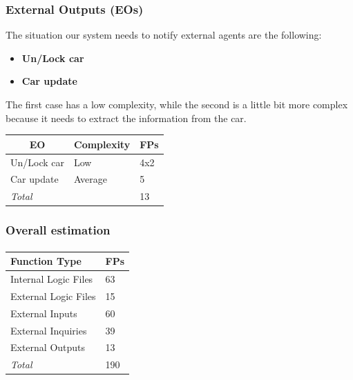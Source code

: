\documentclass[english]{article}
\begin{document}
\paragraph{}

\subsubsection{External Outputs (EOs)}

The situation our system needs to notify external agents are the following:

\begin{itemize}
	\item{\textbf{Un/Lock car}}

	\item{\textbf{Car update}}
\end{itemize}

The first case has a low complexity, while the second is a little bit more complex because it needs to extract the information from the car.

\begin{center}
	\begin{tabular}{ |p{8cm}|m{2cm}|p{1cm}| }
		\hline
		\multicolumn{1}{|c|}{\textbf{EO}} & \multicolumn{1}{c|}{\textbf{Complexity}} & \multicolumn{1}{c|}{\textbf{FPs}} \\
		\hline
		Un/Lock car & Low & 4x2 \\
		\hline
		Car update & Average & 5\\
		\hline
		\multicolumn{2}{|l|}{\textit{Total}} & \multicolumn{1}{l|}{13}\\
		\hline
	\end{tabular}
\end{center}

\newpage
\subsubsection{Overall estimation}

\paragraph{}
\begin{center}
	\begin{tabular}{|p{5cm}|p{1cm}|}
		\hline
		\textbf{Function Type} & \textbf{FPs} \\
		\hline
		Internal Logic Files & 63 \\
		External Logic Files & 15 \\
		External Inputs & 60 \\
		External Inquiries & 39 \\
		External Outputs & 13 \\
		\hline
		\textit{Total} & 190 \\
		\hline
	\end{tabular}
\end{center}
\end{document}
